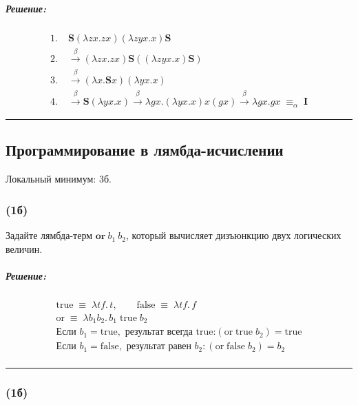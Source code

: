 \documentclass{article}
\newenvironment{proof}{\subparagraph{\hspace{-1em}Решение:\newline}}{\par\noindent\rule{\textwidth}{0.4pt}}
\begin{document}
    \begin{proof}
        \[
            \begin{aligned}
                \text{1.} \;& \mathbf{S} (\lambda z x. z x) (\lambda z y x. x) \mathbf{S} \\[1mm]
                \text{2.} \;& \xrightarrow{\beta} (\lambda z x. z x) \mathbf{S} ((\lambda z y x. x) \mathbf{S}) \\[1mm]
                \text{3.} \;& \xrightarrow{\beta} (\lambda x. \mathbf{S} x) (\lambda y x. x) \\[1mm]
                \text{4.} \;& \xrightarrow{\beta} \mathbf{S} (\lambda y x. x) \xrightarrow{\beta} \lambda g x. (\lambda y x. x) x (g x) \xrightarrow{\beta} \lambda g x. g x \;\equiv_\alpha\; \mathbf{I}
            \end{aligned}
        \]
    \end{proof}

    \subsection{Программирование в лямбда-исчислении}

    Локальный минимум: 3б.

    \subsubsection{(1б)}

    Задайте лямбда-терм $\textbf{or}~b_1~b_2$, который вычисляет дизъюнкцию двух логических величин.

    \begin{proof}
        \begin{gather*}
            \text{true} \;\equiv\; \lambda t f.\, t,
            \qquad
            \text{false} \;\equiv\; \lambda t f.\, f\\
            \text{or} \;\equiv\; \lambda b_1 b_2.\, b_1\; \text{true}\; b_2\\
            \text{Если } b_1 = \text{true}, \text{ результат всегда true:}
            (\text{or}\; \text{true}\; b_2) = \text{true}\\
            \text{Если } b_1 = \text{false}, \text{ результат равен } b_2:
            (\text{or}\; \text{false}\; b_2) = b_2\\
        \end{gather*}
    \end{proof}

    \subsubsection{(1б)}
\end{document}
